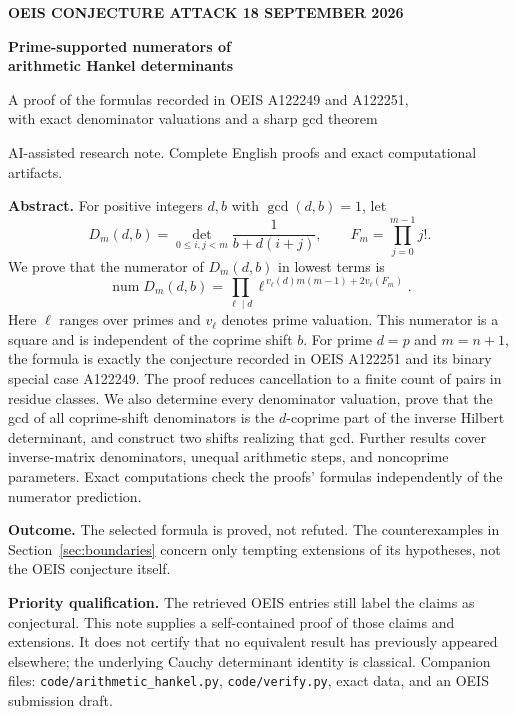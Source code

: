 \documentclass[11pt,a4paper]{article}
\theoremstyle{definition}
\theoremstyle{remark}
\newcommand{\num}{\operatorname{num}}
\newcommand{\sfac}{F}
\begin{document}
\thispagestyle{empty}
{\small\bfseries\color{Accent}OEIS CONJECTURE ATTACK \hfill 18 SEPTEMBER 2026\par}
\vspace{8mm}
{\LARGE\bfseries\color{Ink}Prime-supported numerators of\\[2mm]
arithmetic Hankel determinants\par}
\vspace{4mm}
{\large A proof of the formulas recorded in OEIS A122249 and A122251,\\
with exact denominator valuations and a sharp gcd theorem\par}
\vspace{5mm}
{\small AI-assisted research note. Complete English proofs and exact computational artifacts.\par}
\vspace{6mm}
\begin{tcolorbox}[colback=Pale,colframe=Accent,boxrule=0.5pt,arc=1mm,
  left=3mm,right=3mm,top=2mm,bottom=2mm]
\textbf{Abstract.}
For positive integers $d,b$ with $\gcd(d,b)=1$, let
\[
 D_m(d,b)=\det_{0\le i,j<m}\frac1{b+d(i+j)},\qquad
 \sfac_m=\prod_{j=0}^{m-1}j!.
\]
We prove that the numerator of $D_m(d,b)$ in lowest terms is
\[
 \boxed{\num D_m(d,b)=
 \prod_{\ell\mid d}\ell^{\,v_\ell(d)m(m-1)+2v_\ell(\sfac_m)}.}
\]
Here $\ell$ ranges over primes and $v_\ell$ denotes prime valuation.
This numerator is a square and is independent of the coprime shift $b$. For prime $d=p$ and $m=n+1$, the formula is exactly the conjecture
recorded in OEIS A122251 and its binary special case A122249.
The proof reduces cancellation to a finite count of pairs in residue classes.
We also determine every denominator valuation, prove that the gcd of all
coprime-shift denominators is the $d$-coprime part of the inverse Hilbert
determinant, and construct two shifts realizing that gcd. Further results
cover inverse-matrix denominators, unequal arithmetic steps, and noncoprime
parameters. Exact computations check the proofs' formulas independently of
the numerator prediction.
\end{tcolorbox}
\vspace{2mm}
\textbf{Outcome.} The selected formula is proved, not refuted. The
counterexamples in Section~\ref{sec:boundaries} concern only tempting
extensions of its hypotheses, not the OEIS conjecture itself.

\textbf{Priority qualification.} The retrieved OEIS entries still label the
claims as conjectural. This note supplies a self-contained proof of those
claims and extensions. It does not certify that no equivalent result has
previously appeared elsewhere; the underlying Cauchy determinant identity
is classical.
\vfill
{\small\color{Accent}Companion files: \texttt{code/arithmetic\_hankel.py},
\texttt{code/verify.py}, exact data, and an OEIS submission draft.}
\newpage
\tableofcontents
\newpage
\end{document}

